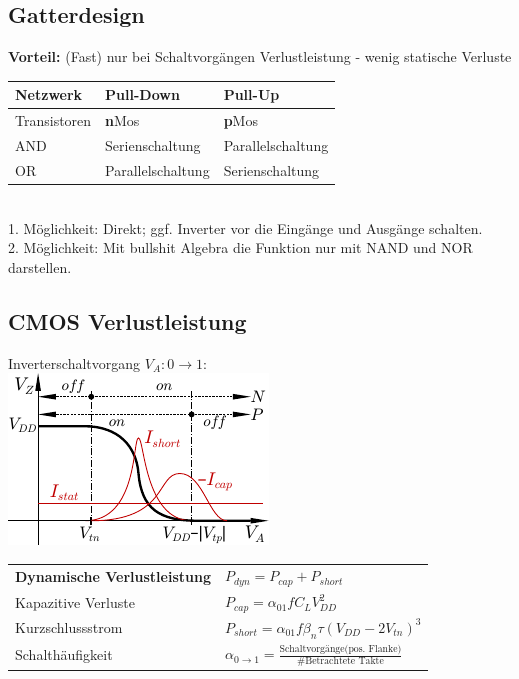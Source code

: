 \documentclass[6pt,a4paper]{scrartcl}
\renewcommand{\emph}[1]{\textsf{\textbf{#1}}}
\newcommand{\ra}[0]{\ensuremath{\rightarrow}} 									%
\begin{document}
\begin{multicols}{3}
	\subsection{Gatterdesign}
	\emph{Vorteil:}	 (Fast) nur bei Schaltvorgängen Verlustleistung - wenig statische Verluste
	\begin{tabular}{l|l|l}
		Netzwerk & Pull-Dow\bf{n} & Pull-U\bf{p} \\ \midrule
		Transistoren & \textbf{n}Mos & \textbf{p}Mos \\
		AND & Serienschaltung	 & Parallelschaltung \\
		OR & Parallelschaltung & Serienschaltung \\
	\end{tabular}\\
	1. Möglichkeit: Direkt; ggf. Inverter vor die Eingänge und Ausgänge schalten.\\
	2. Möglichkeit: Mit bullshit Algebra die Funktion nur mit NAND und NOR darstellen.\\

	\subsection{CMOS Verlustleistung}
	Inverterschaltvorgang $V_A: 0 \ra 1$:\\
	\includegraphics{img/ds/char_inverter.pdf}
	
	\begin{tabular}{ll}
		\emph{Dynamische Verlustleistung}	& $P_{dyn} = P_{cap} + P_{short}$\\
		\quad Kapazitive Verluste & $P_{cap} = \alpha_{01} f C_L V_{DD}^2$\\
		\quad Kurzschlussstrom	& $P_{short} = \alpha_{01} f \beta_n \tau (V_{DD} - 2V_{tn})^3$\\[0.8em]
		\quad Schalthäufigkeit & $\alpha_{0 \rightarrow 1} = \frac{\text{Schaltvorgänge(pos. Flanke)}}{\text{\# Betrachtete Takte}}$\\
	\end{tabular}\\
	

\end{multicols}
\end{document}
